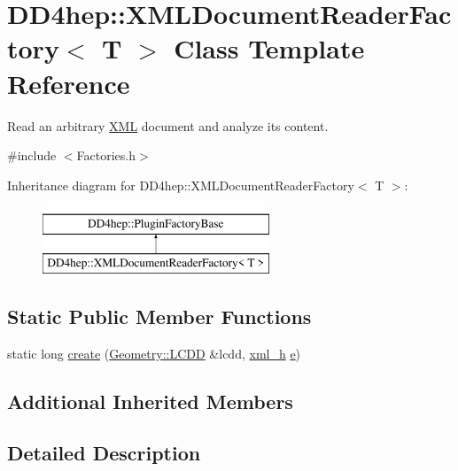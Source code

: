 \hypertarget{class_d_d4hep_1_1_x_m_l_document_reader_factory}{}\section{D\+D4hep\+:\+:X\+M\+L\+Document\+Reader\+Factory$<$ T $>$ Class Template Reference}
\label{class_d_d4hep_1_1_x_m_l_document_reader_factory}


Read an arbitrary \hyperlink{namespace_d_d4hep_1_1_x_m_l}{X\+ML} document and analyze it\textquotesingle{}s content.  




{\ttfamily \#include $<$Factories.\+h$>$}

Inheritance diagram for D\+D4hep\+:\+:X\+M\+L\+Document\+Reader\+Factory$<$ T $>$\+:\begin{figure}[H]
\begin{center}
\leavevmode
\includegraphics[height=2.000000cm]{class_d_d4hep_1_1_x_m_l_document_reader_factory}
\end{center}
\end{figure}
\subsection*{Static Public Member Functions}
\begin{DoxyCompactItemize}
\item 
static long \hyperlink{class_d_d4hep_1_1_x_m_l_document_reader_factory_aa504d333a2f40d12a83d0f2d2585938f}{create} (\hyperlink{class_d_d4hep_1_1_geometry_1_1_l_c_d_d}{Geometry\+::\+L\+C\+DD} \&lcdd, \hyperlink{struct_d_d4hep_1_1_plugin_factory_base_aedebe6835e2705756763812545bcb8fd}{xml\+\_\+h} \hyperlink{_volumes_8cpp_a8a9a1f93e9b09afccaec215310e64142}{e})
\end{DoxyCompactItemize}
\subsection*{Additional Inherited Members}


\subsection{Detailed Description}
